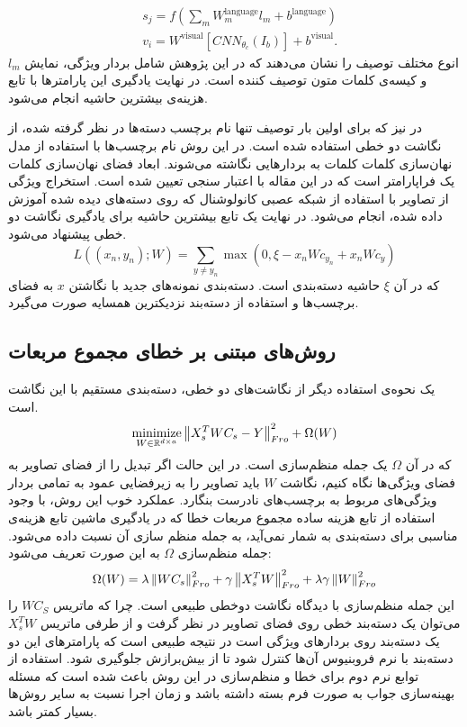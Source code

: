 \begin{align}
& s_j = f\left( \sum_m W^{\text{language}}_m l_m + b^{\text{language}} \right) \nonumber \\
& v_i = W^\text{visual} [CNN_{\theta_c}(I_b)] + b^{\text{visual}}.
\end{align}
$l_m$
انوع مختلف توصیف را نشان می‌دهند که در این پژوهش شامل بردار ویژگی، نمایش   و کیسه‌ی کلمات متون توصیف کننده است. در نهایت یادگیری این پارامترها با تابع هزینه‌ی بیشترین حاشیه انجام می‌شود.


در
\cite{devise}
نیز که برای اولین بار توصیف تنها نام برچسب دسته‌ها در نظر گرفته شده، از نگاشت دو خطی استفاده شده است. در این روش نام برچسب‌ها با استفاده از مدل نهان‌سازی کلمات  کلمات به بردارهایی نگاشته می‌شوند. ابعاد فضای نهان‌سازی کلمات یک فراپارامتر است که در این مقاله با اعتبار سنجی تعیین شده است. استخراج ویژگی از  تصاویر  با استفاده از شبکه عصبی کانولوشنال
\cite{alexnet}
که روی دسته‌های دیده شده آموزش داده شده، انجام می‌شود. در نهایت یک تابع بیشترین حاشیه
برای یادگیری نگاشت دو خطی پیشنهاد می‌شود.
\begin{equation}
 L((x_n, y_n);W) = \sum_{y\neq y_n} \max(0, \xi  - x_nWc_{y_n} + x_nWc_y)
\end{equation}
که در آن $\xi$ حاشیه دسته‌بندی است. دسته‌بندی نمونه‌های جدید با نگاشتن $x$ به فضای برچسب‌ها و استفاده از دسته‌بند نزدیکترین همسایه صورت می‌گیرد.

\subsection{روش‌های مبتنی بر خطای مجموع مربعات} \label{mse_loss_methods}

یک نحوه‌ی استفاده دیگر از نگاشت‌های دو خطی، دسته‌بندی مستقیم با این نگاشت است.
\begin{equation}
\operatorname*{minimize}_{W \in \mathbb{R}^{d \times a}} \left \lVert X_s^T WC_s - Y \right \rVert_{Fro}^2 + \Omega(W) \label{eq:emb}
\end{equation}
که در آن $\Omega$ یک جمله منظم‌سازی است.
در این حالت اگر تبدیل را از فضای تصاویر به فضای ویژگی‌ها نگاه کنیم، نگاشت $W$ باید تصاویر را به زیرفضایی عمود به تمامی بردار ویژگی‌های مربوط به برچسب‌های نادرست بنگارد.
عملکرد خوب این روش، با وجود استفاده از تابع هزینه ساده مجموع مربعات خطا که در یادگیری ماشین تابع هزینه‌ی مناسبی برای دسته‌بندی به شمار نمی‌آید، به جمله منظم سازی آن نسبت داده می‌شود. جمله منظم‌سازی $\Omega$ به این صورت تعریف می‌شود:
\begin{equation} \label{eq:emb_reg}
\Omega(W) = \lambda \left \lVert WC_s \right \rVert_{Fro}^2 + \gamma \left \lVert X_s^T W \right \rVert_{Fro}^2  + \lambda \gamma \left \lVert W \right \rVert_{Fro}^2
\end{equation}
این جمله منظم‌سازی با دیدگاه نگاشت دوخطی طبیعی است. چرا که ماتریس $WC_S$ را می‌توان یک دسته‌بند خطی روی فضای تصاویر در نظر گرفت و از طرفی ماتریس $X_s^T W$ یک دسته‌بند روی بردارهای ویژگی است در نتیجه طبیعی است که پارامترهای این دو دسته‌بند با نرم فروبنیوس آن‌ها کنترل شود تا از بیش‌‌برازش
 جلوگیری شود.
استفاده از توابع نرم دوم برای خطا و منظم‌سازی در این روش باعث شده است که مسئله بهینه‌سازی جواب به صورت فرم بسته داشته باشد و زمان اجرا نسبت به سایر روش‌ها بسیار کمتر باشد.

